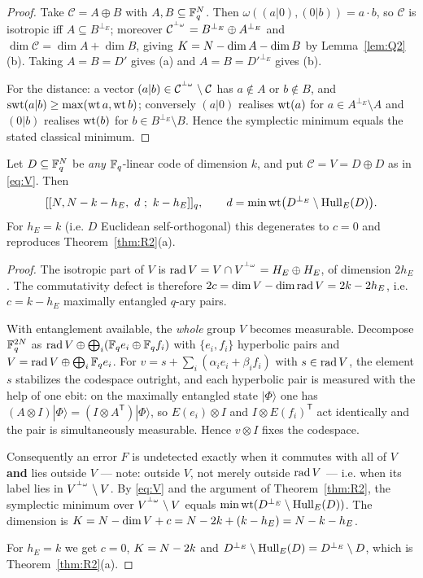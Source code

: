 \begin{proof}
Take $\mathcal C=A\oplus B$ with $A,B\subseteq\mathbb F_q^{N}$. Then
$\omega((a|0),(0|b))=a\cdot b$, so $\mathcal C$ is isotropic iff
$A\subseteq B^{\perp_E}$; moreover $\mathcal C^{{}^{\perp_\omega}}
=B^{\perp_E}\oplus A^{\perp_E}$ and $\dim\mathcal C=\dim A+\dim B$, giving
$K=N-\dim A-\dim B$ by Lemma~\ref{lem:Q2}(b). Taking $A=B=D'$ gives (a) and
$A=B=D'^{\perp_E}$ gives (b).

For the distance: a vector $(a|b)\in\mathcal C^{{}^{\perp_\omega}}\setminus\mathcal C$
has $a\notin A$ or $b\notin B$, and
$\operatorname{swt}(a|b)\ge\max(\operatorname{wt} a,\operatorname{wt} b)$; conversely $(a|0)$ realises $\operatorname{wt}(a)$ for
$a\in A^{\perp_E}\setminus A$ and $(0|b)$ realises $\operatorname{wt}(b)$ for
$b\in B^{\perp_E}\setminus B$. Hence the symplectic minimum equals the stated
classical minimum.
\end{proof}

\begin{theorem}\label{thm:R3}
Let $D\subseteq\mathbb F_q^{N}$ be \emph{any} $\mathbb F_q$-linear code of dimension $k$,
and put $\mathcal C=V=D\oplus D$ as in \eqref{eq:V}. Then
\[
  [[N,N-k-h_E,\ d\ ;\ k-h_E]]_q,\qquad
  d=\min\operatorname{wt}\bigl(D^{\perp_E}\setminus\operatorname{Hull}_E(D)\bigr).
\]
For $h_E=k$ (i.e. $D$ Euclidean self-orthogonal) this degenerates to $c=0$ and
reproduces Theorem~\ref{thm:R2}(a).
\end{theorem}

\begin{proof}
The isotropic part of $V$ is
$\operatorname{rad} V=V\cap V^{{}^{\perp_\omega}}=H_E\oplus H_E$, of dimension $2h_E$. The
commutativity defect is therefore
$2c=\dim V-\dim\operatorname{rad} V=2k-2h_E$, i.e. $c=k-h_E$ maximally entangled $q$-ary
pairs.

With entanglement available, the \emph{whole} group $V$ becomes measurable.
Decompose $\mathbb F_q^{2N}$ as $\operatorname{rad} V\oplus\bigoplus_i(\mathbb F_qe_i\oplus\mathbb F_qf_i)$
with $\{e_i,f_i\}$ hyperbolic pairs and $V=\operatorname{rad} V\oplus\bigoplus_i\mathbb F_qe_i$.
For $v=s+\sum_i(\alpha_ie_i+\beta_if_i)$ with $s\in\operatorname{rad} V$, the element $s$
stabilizes the codespace outright, and each hyperbolic pair is measured with the
help of one ebit: on the maximally entangled state $|\Phi\rangle$ one has
$(A\otimes I)|\Phi\rangle=(I\otimes A^{\mathsf T})|\Phi\rangle$, so
$E(e_i)\otimes I$ and $I\otimes E(f_i)^{\mathsf T}$ act identically and the
pair is simultaneously measurable. Hence $v\otimes I$ fixes the codespace.

Consequently an error $F$ is undetected exactly when it commutes with all of $V$
\textbf{and} lies outside $V$ --- note: outside $V$, not merely outside
$\operatorname{rad} V$ --- i.e. when its label lies in $V^{{}^{\perp_\omega}}\setminus V$. By
\eqref{eq:V} and the argument of Theorem~\ref{thm:R2}, the symplectic minimum
over $V^{{}^{\perp_\omega}}\setminus V$ equals
$\min\operatorname{wt}(D^{\perp_E}\setminus\operatorname{Hull}_E(D))$. The dimension is
$K=N-\dim V+c=N-2k+(k-h_E)=N-k-h_E$.

For $h_E=k$ we get $c=0$, $K=N-2k$ and
$D^{\perp_E}\setminus\operatorname{Hull}_E(D)=D^{\perp_E}\setminus D$, which is
Theorem~\ref{thm:R2}(a).
\end{proof}

